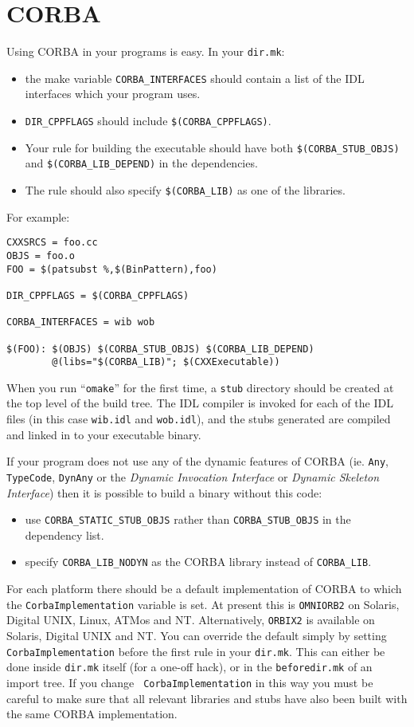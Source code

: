 \documentclass[11pt,twoside,onecolumn]{article}
\begin{document}
\section{CORBA}

Using CORBA in your programs is easy.  In your {\tt dir.mk}:
\begin{itemize}
\item the make variable \verb|CORBA_INTERFACES| should contain a list of the
IDL interfaces which your program uses.
\item \verb|DIR_CPPFLAGS| should include \verb|$(CORBA_CPPFLAGS)|.
\item Your rule for building the executable should have both
\verb|$(CORBA_STUB_OBJS)| and \verb|$(CORBA_LIB_DEPEND)| in the dependencies.
\item The rule should also specify \verb|$(CORBA_LIB)| as one of the libraries.
\end{itemize}
For example:

{\footnotesize \begin{verbatim}
CXXSRCS = foo.cc
OBJS = foo.o
FOO = $(patsubst %,$(BinPattern),foo)

DIR_CPPFLAGS = $(CORBA_CPPFLAGS)

CORBA_INTERFACES = wib wob

$(FOO): $(OBJS) $(CORBA_STUB_OBJS) $(CORBA_LIB_DEPEND)
        @(libs="$(CORBA_LIB)"; $(CXXExecutable))
\end{verbatim}}

When you run ``{\tt omake}'' for the first time, a {\tt stub} directory should
be created at the top level of the build tree.  The IDL compiler is invoked for
each of the IDL files (in this case {\tt wib.idl} and {\tt wob.idl}), and the
stubs generated are compiled and linked in to your executable binary.

If your program does not use any of the dynamic features of CORBA
(ie. \verb|Any|, \verb|TypeCode|, \verb|DynAny| or the \emph{Dynamic
Invocation Interface} or \emph{Dynamic Skeleton Interface}) then it is
possible to build a binary without this code:
\begin{itemize}
\item use \verb|CORBA_STATIC_STUB_OBJS| rather than \verb|CORBA_STUB_OBJS| in
the dependency list.
\item specify \verb|CORBA_LIB_NODYN| as the CORBA library instead of
\verb|CORBA_LIB|.
\end{itemize}

For each platform there should be a default implementation of CORBA to which
the {\tt CorbaImplementation} variable is set. At present this is 
{\tt OMNIORB2} on Solaris, Digital UNIX, Linux, ATMos and
NT. Alternatively, {\tt ORBIX2} is available on Solaris, Digital UNIX and NT.
You can override the default simply by setting
{\tt CorbaImplementation} before the first rule in your {\tt dir.mk}.
This can either be done inside {\tt dir.mk} itself (for a one-off hack), or in
the {\tt beforedir.mk} of an import tree.  If you change {\tt
CorbaImplementation} in this way you must be careful to make sure that all
relevant libraries and stubs have also been built with the same CORBA
implementation.
\end{document}

